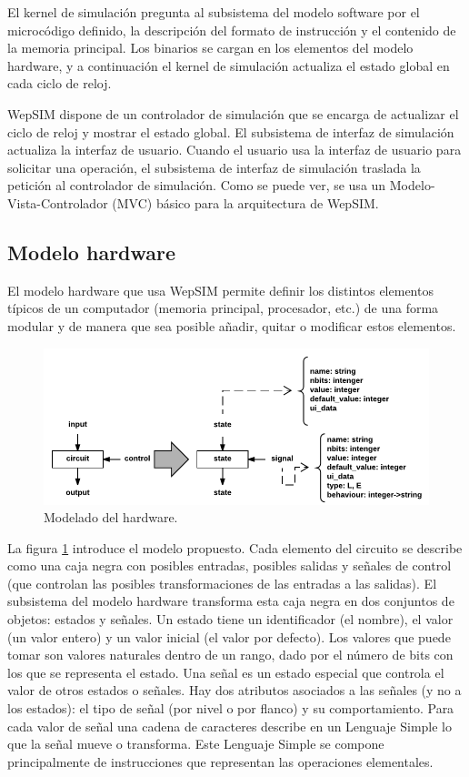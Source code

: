 El kernel de simulación pregunta al subsistema del modelo software por el microcódigo definido, la descripción del formato de instrucción y el contenido de la memoria principal. Los binarios se cargan en los elementos del modelo hardware, y a continuación el kernel de simulación actualiza el estado global en cada ciclo de reloj.


WepSIM dispone de un controlador de simulación que se encarga de actualizar el ciclo de reloj y mostrar el estado global. El subsistema de interfaz de simulación actualiza la interfaz de usuario. Cuando el usuario usa la interfaz de usuario para solicitar una operación, el subsistema de interfaz de simulación traslada la petición al controlador de simulación. Como se puede ver, se usa un Modelo- Vista-Controlador (MVC) básico para la arquitectura de WepSIM.

\subsection{Modelo hardware}

El modelo hardware que usa WepSIM permite definir los distintos elementos típicos de un computador (memoria principal, procesador, etc.) de una forma modular y de manera que sea posible añadir, quitar o modificar estos elementos.

\begin{figure}[htbp]
 	\centering
 	\includegraphics[width=14cm]{figures/hardware_model}
 	\caption{Modelado del hardware.}
	\label{fig:hardware_model_diagram}
\end{figure}

La figura \ref{fig:hardware_model_diagram} introduce el modelo propuesto. Cada elemento del circuito se describe como una caja negra con posibles entradas, posibles salidas y señales de control (que controlan las posibles transformaciones de las entradas a las salidas). El subsistema del modelo hardware transforma esta caja negra en dos conjuntos de objetos: estados y señales. Un estado tiene un identificador (el nombre), el valor (un valor entero) y un valor inicial (el valor por defecto). Los valores que puede tomar son valores naturales dentro de un rango, dado por el número de bits con los que se representa el estado. Una señal es un estado especial que controla el valor de otros estados o señales. Hay dos atributos asociados a las señales (y no a los estados): el tipo de señal (por nivel o por flanco) y su comportamiento. Para cada valor de señal una cadena de caracteres describe en un Lenguaje Simple lo que la señal mueve o transforma. Este Lenguaje Simple se compone principalmente de instrucciones que representan las operaciones elementales.

